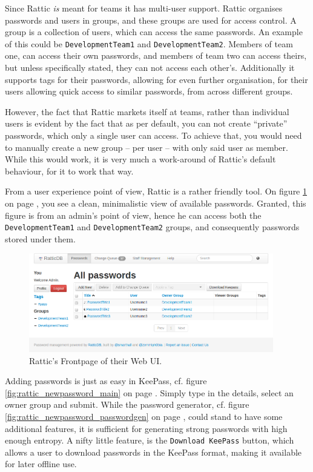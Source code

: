 			Since Rattic \emph{is} meant for teams it has multi-user support. Rattic organises passwords and users in groups, and these groups are used for access control. A group is a collection of users, which can access the same passwords. An example of this could be \verb=DevelopmentTeam1= and \verb=DevelopmentTeam2=. Members of team one, can access their own passwords, and members of team two can access theirs, but unless specifically stated, they can not access each other's. Additionally it supports tags for their passwords, allowing for even further organisation, for their users allowing quick access to similar passwords, from across different groups.

			However, the fact that Rattic markets itself at teams, rather than individual users is evident by the fact that as per default, you can not create ``private'' passwords, which only a single user can access. To achieve that, you would need to manually create a new group -- per user -- with only said user as member. While this would work, it is very much a work-around of Rattic's default behaviour, for it to work that way.

			From a user experience point of view, Rattic is a rather friendly tool. On figure \ref{fig:rattic_main} on page \pageref{fig:rattic_main}, you see a clean, minimalistic view of available passwords. Granted, this figure is from an admin's point of view, hence he can access both the \verb=DevelopmentTeam1= and \verb=DevelopmentTeam2= groups, and consequently passwords stored under them.

			\begin{figure}[h!]
				\centering
				\includegraphics[width=0.95\textwidth]{figures/analysis/rattic_main.png}
				\caption{Rattic's Frontpage of their Web UI.}
				\label{fig:rattic_main}
			\end{figure}

			Adding passwords is just as easy in KeePass, cf. figure \ref{fig:rattic_newpassword_main} on page \pageref{fig:rattic_newpassword_main}. Simply type in the details, select an owner group and submit. While the password generator, cf. figure \ref{fig:rattic_newpassword_passwordgen} on page \pageref{fig:rattic_newpassword_passwordgen}, could stand to have some additional features, it is sufficient for generating strong passwords with high enough entropy. A nifty little feature, is the \verb=Download KeePass= button, which allows a user to download passwords in the KeePass format, making it available for later offline use.

